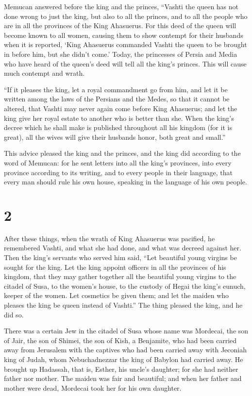  Memucan answered before the king and the princes,
``Vashti the queen has not done wrong to just the king, but also to all
the princes, and to all the people who are in all the provinces of the
King Ahasuerus.  For this deed of the queen will become
known to all women, causing them to show contempt for their husbands
when it is reported, `King Ahasuerus commanded Vashti the queen to be
brought in before him, but she didn't come.'  Today, the
princesses of Persia and Media who have heard of the queen's deed will
tell all the king's princes. This will cause much contempt and wrath.

 ``If it pleases the king, let a royal commandment go
from him, and let it be written among the laws of the Persians and the
Medes, so that it cannot be altered, that Vashti may never again come
before King Ahasuerus; and let the king give her royal estate to another
who is better than she.  When the king's decree which he
shall make is published throughout all his kingdom (for it is great),
all the wives will give their husbands honor, both great and small.''

 This advice pleased the king and the princes, and the
king did according to the word of Memucan:  for he sent
letters into all the king's provinces, into every province according to
its writing, and to every people in their language, that every man
should rule his own house, speaking in the language of his own people.

\hypertarget{section-1}{%
\section{2}\label{section-1}}

 After these things, when the wrath of King Ahasuerus was
pacified, he remembered Vashti, and what she had done, and what was
decreed against her.  Then the king's servants who served
him said, ``Let beautiful young virgins be sought for the king.
 Let the king appoint officers in all the provinces of his
kingdom, that they may gather together all the beautiful young virgins
to the citadel of Susa, to the women's house, to the custody of Hegai
the king's eunuch, keeper of the women. Let cosmetics be given them;
 and let the maiden who pleases the king be queen instead
of Vashti.'' The thing pleased the king, and he did so.

 There was a certain Jew in the citadel of Susa whose name
was Mordecai, the son of Jair, the son of Shimei, the son of Kish, a
Benjamite,  who had been carried away from Jerusalem with
the captives who had been carried away with Jeconiah king of Judah, whom
Nebuchadnezzar the king of Babylon had carried away.  He
brought up Hadassah, that is, Esther, his uncle's daughter; for she had
neither father nor mother. The maiden was fair and beautiful; and when
her father and mother were dead, Mordecai took her for his own daughter.

